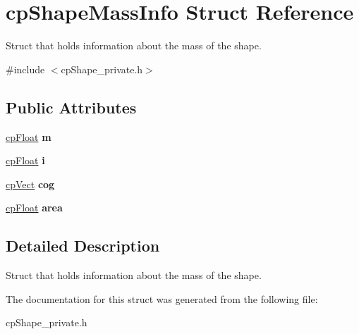 \hypertarget{structcp_shape_mass_info}{}\section{cp\+Shape\+Mass\+Info Struct Reference}
\label{structcp_shape_mass_info}


Struct that holds information about the mass of the shape.  




{\ttfamily \#include $<$cp\+Shape\+\_\+private.\+h$>$}

\subsection*{Public Attributes}
\begin{DoxyCompactItemize}
\item 
\hypertarget{structcp_shape_mass_info_a58bfe9fbe8e65d4c6d85e85239ed2949}{}\hyperlink{group__basic_types_gac1ed65573e035bf892505768c852d8d3}{cp\+Float} {\bfseries m}\label{structcp_shape_mass_info_a58bfe9fbe8e65d4c6d85e85239ed2949}

\item 
\hypertarget{structcp_shape_mass_info_aeafbe883d745085473803f94fcbbc4a6}{}\hyperlink{group__basic_types_gac1ed65573e035bf892505768c852d8d3}{cp\+Float} {\bfseries i}\label{structcp_shape_mass_info_aeafbe883d745085473803f94fcbbc4a6}

\item 
\hypertarget{structcp_shape_mass_info_ae030b38dca3b580d186f704b588dfb1a}{}\hyperlink{structcp_vect}{cp\+Vect} {\bfseries cog}\label{structcp_shape_mass_info_ae030b38dca3b580d186f704b588dfb1a}

\item 
\hypertarget{structcp_shape_mass_info_a9ca38a5d2d0a13fb72b64a18c8f9de01}{}\hyperlink{group__basic_types_gac1ed65573e035bf892505768c852d8d3}{cp\+Float} {\bfseries area}\label{structcp_shape_mass_info_a9ca38a5d2d0a13fb72b64a18c8f9de01}

\end{DoxyCompactItemize}


\subsection{Detailed Description}
Struct that holds information about the mass of the shape. 

The documentation for this struct was generated from the following file\+:\begin{DoxyCompactItemize}
\item 
cp\+Shape\+\_\+private.\+h\end{DoxyCompactItemize}
